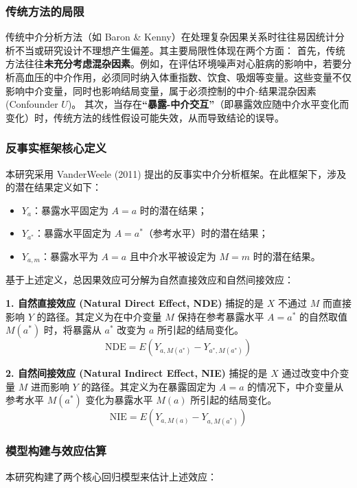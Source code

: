 \documentclass[lang=cn,a4paper,newtx,code=minted,codebg=light]{elegantpaper}
\begin{document}
\subsubsection{传统方法的局限}
传统中介分析方法（如 Baron \& Kenny）在处理复杂因果关系时往往易因统计分析不当或研究设计不理想产生偏差。其主要局限性体现在两个方面：
首先，传统方法往往\textbf{未充分考虑混杂因素}。例如，在评估环境噪声对心脏病的影响中，若要分析高血压的中介作用，必须同时纳入体重指数、饮食、吸烟等变量。这些变量不仅影响中介变量，同时也影响结局变量，属于必须控制的中介-结果混杂因素 (Confounder $U$)。
其次，当存在\textbf{“暴露-中介交互”}（即暴露效应随中介水平变化而变化）时，传统方法的线性假设可能失效，从而导致结论的误导。

\subsubsection{反事实框架核心定义}
本研究采用 VanderWeele (2011) 提出的反事实中介分析框架。在此框架下，涉及的潜在结果定义如下：
\begin{itemize}
    \item $Y_a$：暴露水平固定为 $A = a$ 时的潜在结果；
    \item $Y_{a^*}$：暴露水平固定为 $A = a^*$（参考水平）时的潜在结果；
    \item $Y_{a,m}$：暴露水平为 $A = a$ 且中介水平被设定为 $M = m$ 时的潜在结果。
\end{itemize}

基于上述定义，总因果效应可分解为自然直接效应和自然间接效应：

\textbf{1. 自然直接效应 (Natural Direct Effect, NDE)}
捕捉的是 $X$ 不通过 $M$ 而直接影响 $Y$ 的路径。其定义为在中介变量 $M$ 保持在参考暴露水平 $A = a^*$ 的自然取值 $M(a^*)$ 时，将暴露从 $a^*$ 改变为 $a$ 所引起的结局变化。
\begin{equation}
    \text{NDE} = E\left(Y_{a,M(a^*)} - Y_{a^*,M(a^*)}\right)
\end{equation}

\textbf{2. 自然间接效应 (Natural Indirect Effect, NIE)}
捕捉的是 $X$ 通过改变中介变量 $M$ 进而影响 $Y$ 的路径。其定义为在暴露固定为 $A = a$ 的情况下，中介变量从参考水平 $M(a^*)$ 变化为暴露水平 $M(a)$ 所引起的结局变化。
\begin{equation}
    \text{NIE} = E\left(Y_{a,M(a)} - Y_{a,M(a^*)}\right)
\end{equation}

\subsubsection{模型构建与效应估算}
本研究构建了两个核心回归模型来估计上述效应：
\end{document}
